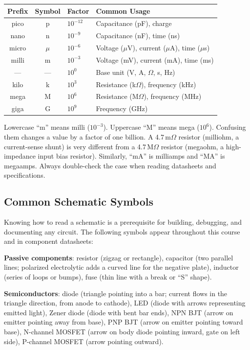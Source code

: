 \documentclass[11pt,letterpaper,twoside,openany]{book}
\begin{document}
\begin{center}
\begin{tabular}{ccll}
\toprule
\textbf{Prefix} & \textbf{Symbol} & \textbf{Factor} & \textbf{Common Usage} \\
\midrule
pico  & p  & $10^{-12}$ & Capacitance (pF), charge \\
nano  & n  & $10^{-9}$  & Capacitance (nF), time (ns) \\
micro & $\mu$ & $10^{-6}$ & Voltage ($\mu$V), current ($\mu$A), time ($\mu$s) \\
milli & m  & $10^{-3}$  & Voltage (mV), current (mA), time (ms) \\
---   & ---  & $10^{0}$ & Base unit (V, A, $\Omega$, s, Hz) \\
kilo  & k  & $10^{3}$   & Resistance (k$\Omega$), frequency (kHz) \\
mega  & M  & $10^{6}$   & Resistance (M$\Omega$), frequency (MHz) \\
giga  & G  & $10^{9}$   & Frequency (GHz) \\
\bottomrule
\end{tabular}
\end{center}

\begin{warningbox}
Lowercase ``m'' means milli ($10^{-3}$). Uppercase ``M'' means mega ($10^{6}$). Confusing them changes a value by a factor of one billion. A 4.7\,m$\Omega$ resistor (milliohm, a current-sense shunt) is very different from a 4.7\,M$\Omega$ resistor (megaohm, a high-impedance input bias resistor). Similarly, ``mA'' is milliamps and ``MA'' is megaamps. Always double-check the case when reading datasheets and specifications.
\end{warningbox}

\subsection{Common Schematic Symbols}
Knowing how to read a schematic is a prerequisite for building, debugging, and documenting any circuit. The following symbols appear throughout this course and in component datasheets:

\textbf{Passive components}: resistor (zigzag or rectangle), capacitor (two parallel lines; polarized electrolytic adds a curved line for the negative plate), inductor (series of loops or bumps), fuse (thin line with a break or ``S'' shape).

\textbf{Semiconductors}: diode (triangle pointing into a bar; current flows in the triangle direction, from anode to cathode), LED (diode with arrows representing emitted light), Zener diode (diode with bent bar ends), NPN BJT (arrow on emitter pointing away from base), PNP BJT (arrow on emitter pointing toward base), N-channel MOSFET (arrow on body diode pointing inward, gate on left side), P-channel MOSFET (arrow pointing outward).
\end{document}
